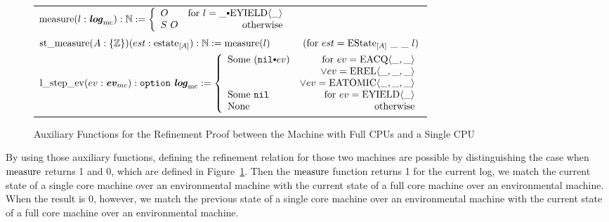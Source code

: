 \begin{figure}
\noindent{}
\begin{center}
\begin{tabular}{l}
$
   \mcmeasurekwd (l : \mclog)  : \nattype :=
     \left\{\begin{array}{lr}
        O & \text{for }  l = \listconsoppo{\yieldev{\_}}{\_} \\
        S \ O & \text{otherwise}\\
        \end{array} \right.$ \\
$ \mcstatemeasurekwd (A : \set{\ztype}) (est : \envstatekwd_{[A]}) : \nattype := \mcmeasurenoeq{l} \ \ \ \ \ \ \ \ \ \ (\text{for } est = \envstate{A}{\_}{\_}{l}) $\\
$ \localstepevkwd (ev : \mcevent) : \optiondef\ \mclog := 
     \left\{\begin{array}{lr}
        \mathrm{Some} \ (\listconsoppo{ev}{\nulllist}) & \text{for }  ev = \acqev{\_}{\_} \\
                                        & \vee  ev= \relev{\_}{\_}{\_} \\
                                        & \vee ev= \atomicev{\_}{\_}{\_} \\
        \mathrm{Some} \ \nulllist & \text{for }  ev = \yieldev{\_} \\
	   \mathrm{None} & \text{otherwise}\\
        \end{array} \right. $ \\
\end{tabular}        
\end{center}
%  
%
\caption{Auxiliary Functions for the  Refinement Proof between the Machine with Full CPUs and a Single CPU}
\label{fig:chapter:conlink:auxiliary-function-for-full-cpus-and-a-single-cpu}
\end{figure}


By using those auxiliary functions, defining the refinement relation for those two machines are possible 
by distinguishing the case when ${\mathrm{measure}}$ returns 1 and 0, which are
 defined in Figure~\ref{fig:chapter:conlink:auxiliary-function-for-full-cpus-and-a-single-cpu}.
Then the ${\mathrm{measure}}$  function returns 1 for the current log,
we match the current state of a single core machine over an environmental machine 
with the current state of a full core machine over an environmental machine.
When the result is 0, however, 
we match the previous state of a single core machine over an environmental machine 
with the current state of a full core machine over an environmental machine. 

